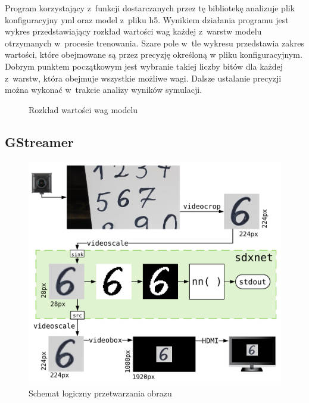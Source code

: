 \documentclass[12pt, oneside, a4paper]{article}
\begin{document}
Program korzystający z~funkcji dostarczanych przez tę bibliotekę
analizuje plik konfiguracyjny yml oraz model z~pliku h5.
Wynikiem działania programu jest wykres przedstawiający
rozkład wartości wag każdej z~warstw modelu otrzymanych w~procesie trenowania.
Szare pole w~tle wykresu
przedstawia zakres wartości, które obejmowane są przez precyzję określoną
w pliku konfiguracyjnym. Dobrym punktem początkowym jest wybranie takiej
liczby bitów dla każdej z~warstw, która obejmuje wszystkie możliwe wagi.
Dalsze ustalanie precyzji można wykonać w~trakcie analizy wyników
symulacji.
\begin{figure}[H]
  \centering
  
  \caption{Rozkład wartości wag modelu}\label{fig:weights_dist}
\end{figure}


\subsection{GStreamer}\label{sec:GStreamer}
\begin{figure}[h]
  \centering
  \includegraphics[width=0.95\linewidth]{figures/image_flow.png}
  \caption{Schemat logiczny przetwarzania obrazu}\label{fig:image_flow}
\end{figure}
\end{document}
